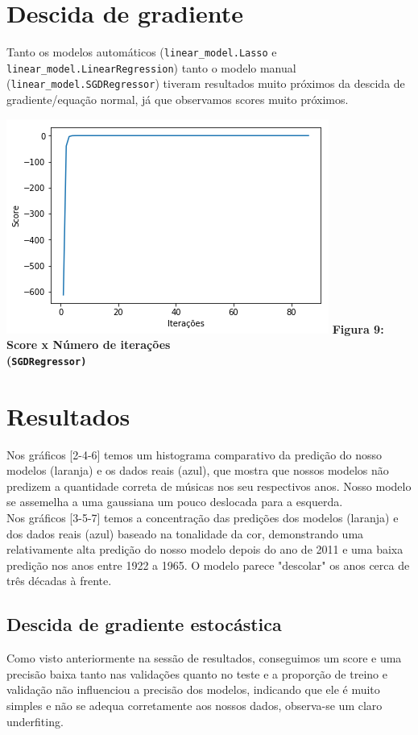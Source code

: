 \documentclass[conference]{IEEEtran}
\begin{document}
\section{Descida de gradiente}
Tanto os modelos automáticos (\texttt{linear\_model.Lasso} e \texttt{linear\_model.LinearRegression}) tanto o modelo manual (\texttt{linear\_model.SGDRegressor}) tiveram resultados muito próximos da descida de gradiente/equação normal, já que observamos scores muito próximos.

\begin{center}
\includegraphics[scale=0.6]{plot8}
\textbf{Figura 9: Score x Número de iterações \\ (\texttt{SGDRegressor)}}
\end{center}

\section{Resultados}
  Nos gráficos [2-4-6] temos um histograma comparativo da predição do nosso modelos (laranja) e os dados reais (azul), que mostra que nossos modelos não predizem a quantidade correta de músicas nos seu respectivos anos. Nosso modelo se assemelha a uma gaussiana um pouco deslocada para a esquerda.\\
  Nos gráficos [3-5-7] temos a concentração das predições dos modelos (laranja) e dos dados reais (azul) baseado na tonalidade da cor, demonstrando uma relativamente alta predição do nosso modelo depois do ano de 2011 e uma baixa predição nos anos entre 1922 a 1965. O modelo parece "descolar" os anos cerca de três décadas à frente.
\subsection{Descida de gradiente estocástica}
  Como visto anteriormente na sessão de resultados, conseguimos um score e uma precisão baixa tanto nas validações quanto no teste e a proporção de treino e validação não influenciou a precisão dos modelos, indicando que ele é muito simples e não se adequa corretamente aos nossos dados, observa-se um claro underfiting.
\end{document}
